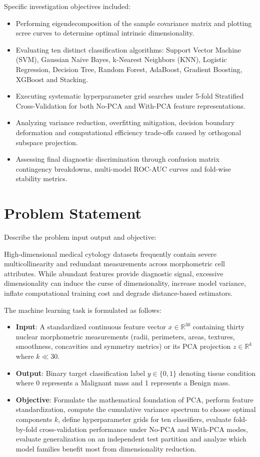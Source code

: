 \documentclass[12pt,a4paper]{article}
\begin{document}
Specific investigation objectives included:
\begin{itemize}
\item Performing eigendecomposition of the sample covariance matrix and plotting scree curves to determine optimal intrinsic dimensionality.
\item Evaluating ten distinct classification algorithms: Support Vector Machine (SVM), Gaussian Naive Bayes, k-Nearest Neighbors (KNN), Logistic Regression, Decision Tree, Random Forest, AdaBoost, Gradient Boosting, XGBoost and Stacking.
\item Executing systematic hyperparameter grid searches under 5-fold Stratified Cross-Validation for both No-PCA and With-PCA feature representations.
\item Analyzing variance reduction, overfitting mitigation, decision boundary deformation and computational efficiency trade-offs caused by orthogonal subspace projection.
\item Assessing final diagnostic discrimination through confusion matrix contingency breakdowns, multi-model ROC-AUC curves and fold-wise stability metrics.
\end{itemize}

\section{Problem Statement}
Describe the problem input output and objective:

High-dimensional medical cytology datasets frequently contain severe multicollinearity and redundant measurements across morphometric cell attributes. While abundant features provide diagnostic signal, excessive dimensionality can induce the curse of dimensionality, increase model variance, inflate computational training cost and degrade distance-based estimators.

The machine learning task is formulated as follows:
\begin{itemize}
\item \textbf{Input}: A standardized continuous feature vector $x \in \mathbb{R}^{30}$ containing thirty nuclear morphometric measurements (radii, perimeters, areas, textures, smoothness, concavities and symmetry metrics) or its PCA projection $z \in \mathbb{R}^{k}$ where $k \ll 30$.
\item \textbf{Output}: Binary target classification label $y \in \{0, 1\}$ denoting tissue condition where 0 represents a Malignant mass and 1 represents a Benign mass.
\item \textbf{Objective}: Formulate the mathematical foundation of PCA, perform feature standardization, compute the cumulative variance spectrum to choose optimal components $k$, define hyperparameter grids for ten classifiers, evaluate fold-by-fold cross-validation performance under No-PCA and With-PCA modes, evaluate generalization on an independent test partition and analyze which model families benefit most from dimensionality reduction.
\end{itemize}
\end{document}
